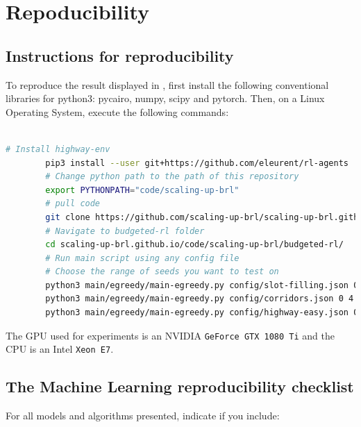 \section{Repoducibility}

\subsection{Instructions for reproducibility}
\label{subsubsec:instruction-reproducibility}
To reproduce the result displayed in , first install the following conventional libraries for python3: pycairo, numpy, scipy and pytorch. Then, on a Linux Operating System, execute the following commands:\\
\\
\begin{minipage}{\linewidth}
    \begin{lstlisting}[language=bash,label={fig:instructions},title={Instructions to reproduce experiments},breaklines,captionpos=b]
        # Install highway-env
        pip3 install --user git+https://github.com/eleurent/rl-agents
        # Change python path to the path of this repository
        export PYTHONPATH="code/scaling-up-brl"
        # pull code
        git clone https://github.com/scaling-up-brl/scaling-up-brl.github.io.git
        # Navigate to budgeted-rl folder
        cd scaling-up-brl.github.io/code/scaling-up-brl/budgeted-rl/
        # Run main script using any config file
        # Choose the range of seeds you want to test on
        python3 main/egreedy/main-egreedy.py config/slot-filling.json 0 6
        python3 main/egreedy/main-egreedy.py config/corridors.json 0 4
        python3 main/egreedy/main-egreedy.py config/highway-easy.json 0 10
    \end{lstlisting}
\end{minipage}

The \gls{GPU} used for experiments is an NVIDIA \texttt{GeForce GTX 1080 Ti} and the \gls{CPU} is an Intel \texttt{Xeon E7}.


\subsection{The Machine Learning reproducibility checklist}
\label{sec:ml-checklist}
For all models and algorithms presented, indicate if you include:


